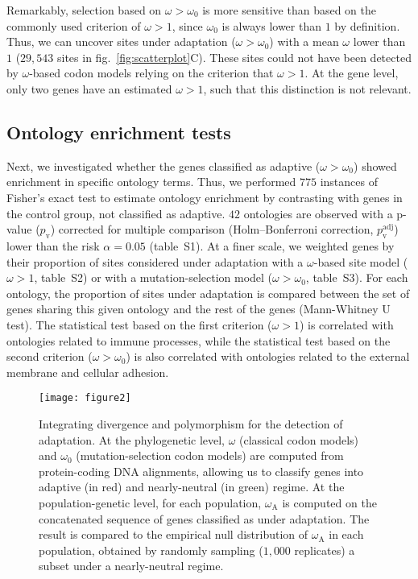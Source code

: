 \documentclass[9pt,twocolumn,twoside,lineno]{pnas-new}
\newcommand{\rateApop}{\omega_{\mathrm{A}}}
\begin{document}
Remarkably, selection based on $\omega>\omega_{0}$ is more sensitive than based on the commonly used criterion of $\omega>1$, since $\omega_{0}$ is always lower than $1$ by definition\cite{spielman_relationship_2015}.
Thus, we can uncover sites under adaptation ($\omega>\omega_{0}$) with a mean $\omega$ lower than $1$ ($29,543$ sites in fig.~\ref{fig:scatterplot}C).
These sites could not have been detected by $\omega$-based codon models relying on the criterion that $\omega>1$.
At the gene level, only two genes have an estimated $\omega > 1$, such that this distinction is not relevant.

\subsection*{Ontology enrichment tests}
Next, we investigated whether the genes classified as adaptive ($\omega > \omega_{0}$) showed enrichment in specific ontology terms.
Thus, we performed $775$ instances of Fisher's exact test to estimate ontology enrichment by contrasting with genes in the control group, not classified as adaptive.
$42$ ontologies are observed with a p-value ($p_{\mathrm{v}}$) corrected for multiple comparison (Holm–Bonferroni correction, $p_{\mathrm{v}}^{\mathrm{adj}}$) lower than the risk $\alpha=0.05$ (table~S1).
At a finer scale, we weighted genes by their proportion of sites considered under adaptation with a $\omega$-based site model ($\omega > 1$, table~S2) or with a mutation-selection model ($\omega > \omega_{0}$, table~S3).
For each ontology, the proportion of sites under adaptation is compared between the set of genes sharing this given ontology and the rest of the genes (Mann-Whitney U test).
The statistical test based on the first criterion ($\omega>1$) is correlated with ontologies related to immune processes, while the statistical test based on the second criterion ($\omega > \omega_{0}$) is also correlated with ontologies related to the external membrane and cellular adhesion.

\begin{figure*}[t]
       \centering
       \texttt{[image: figure2]}
       \caption{
              Integrating divergence and polymorphism for the detection of adaptation.
              At the phylogenetic level, $\omega$ (classical codon models) and $\omega_{0}$ (mutation-selection codon models) are computed from protein-coding DNA alignments, allowing us to classify genes into adaptive (in red) and nearly-neutral (in green) regime.
              At the population-genetic level, for each population, $\rateApop$ is computed on the concatenated sequence of genes classified as under adaptation.
              The result is compared to the empirical null distribution of $\rateApop$ in each population, obtained by randomly sampling ($1,000$ replicates) a subset under a nearly-neutral regime.
       }
       \label{fig:method}
\end{figure*}
\end{document}
